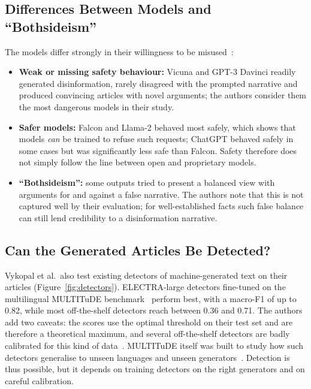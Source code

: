 \subsection{Differences Between Models and ``Bothsideism''}
The models differ strongly in their willingness to be misused~\cite{vykopal2024disinformation}:
\begin{itemize}
    \item \textbf{Weak or missing safety behaviour:} Vicuna and GPT-3 Davinci readily generated disinformation, rarely disagreed with the prompted narrative and produced convincing articles with novel arguments; the authors consider them the most dangerous models in their study. %
    \item \textbf{Safer models:} Falcon and Llama-2 behaved most safely, which shows that models \emph{can} be trained to refuse such requests; ChatGPT behaved safely in some cases but was significantly less safe than Falcon. Safety therefore does not simply follow the line between open and proprietary models. %
    \item \textbf{``Bothsideism'':} some outputs tried to present a balanced view with arguments for and against a false narrative. The authors note that this is not captured well by their evaluation; for well-established facts such false balance can still lend credibility to a disinformation narrative. %
\end{itemize}

\subsection{Can the Generated Articles Be Detected?}
Vykopal et al.\ also test existing detectors of machine-generated text on their articles (Figure~\ref{fig:detectors}). ELECTRA-large detectors fine-tuned on the multilingual MULTITuDE benchmark~\cite{macko2023multitude} perform best, with a macro-F1 of up to 0.82, while most off-the-shelf detectors reach between 0.36 and 0.71. The authors add two caveats: the scores use the optimal threshold on their test set and are therefore a theoretical maximum, and several off-the-shelf detectors are badly calibrated for this kind of data~\cite{vykopal2024disinformation}. %
MULTITuDE itself was built to study how such detectors generalise to unseen languages and unseen generators~\cite{macko2023multitude}. %
Detection is thus possible, but it depends on training detectors on the right generators and on careful calibration.

